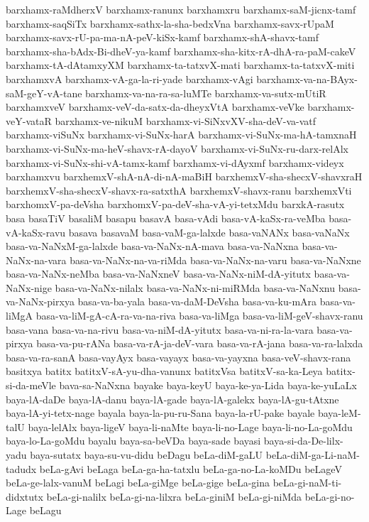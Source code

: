 {barxhamx-raMdherxV
barxhamx-ranunx
barxhamxru
barxhamx-saM-jicnx-tamf
barxhamx-saqSiTx
barxhamx-sathx-la-sha-bedxVna
barxhamx-savx-rUpaM
barxhamx-savx-rU-pa-ma-nA-peV-kiSx-kamf
barxhamx-shA-shavx-tamf
barxhamx-sha-bAdx-Bi-dheV-ya-kamf
barxhamx-sha-kitx-rA-dhA-ra-paM-cakeV
barxhamx-tA-dAtamxyXM
barxhamx-ta-tatxvX-mati
barxhamx-ta-tatxvX-miti
barxhamxvA
barxhamx-vA-ga-la-ri-yade
barxhamx-vAgi
barxhamx-va-na-BAyx-saM-geY-vA-tane
barxhamx-va-na-ra-sa-luMTe
barxhamx-va-sutx-mUtiR
barxhamxveV
barxhamx-veV-da-satx-da-dheyxVtA
barxhamx-veVke
barxhamx-veY-vataR
barxhamx-ve-nikuM
barxhamx-vi-SiNxvXV-sha-deV-va-vatf
barxhamx-viSuNx
barxhamx-vi-SuNx-harA
barxhamx-vi-SuNx-ma-hA-tamxnaH
barxhamx-vi-SuNx-ma-heV-shavx-rA-dayoV
barxhamx-vi-SuNx-ru-darx-relAlx
barxhamx-vi-SuNx-shi-vA-tamx-kamf
barxhamx-vi-dAyxmf
barxhamx-videyx
barxhamxvu
barxhemxV-shA-nA-di-nA-maBiH
barxhemxV-sha-shecxV-shavxraH
barxhemxV-sha-shecxV-shavx-ra-satxthA
barxhemxV-shavx-ranu
barxhemxVti
barxhomxV-pa-deVsha
barxhomxV-pa-deV-sha-vA-yi-tetxMdu
barxkA-rasutx
basa
basaTiV
basaliM
basapu
basavA
basa-vAdi
basa-vA-kaSx-ra-veMba
basa-vA-kaSx-ravu
basava
basavaM
basa-vaM-ga-lalxde
basa-vaNANx
basa-vaNaNx
basa-va-NaNxM-ga-lalxde
basa-va-NaNx-nA-mava
basa-va-NaNxna
basa-va-NaNx-na-vara
basa-va-NaNx-na-va-riMda
basa-va-NaNx-na-varu
basa-va-NaNxne
basa-va-NaNx-neMba
basa-va-NaNxneV
basa-va-NaNx-niM-dA-yitutx
basa-va-NaNx-nige
basa-va-NaNx-nilalx
basa-va-NaNx-ni-miRMda
basa-va-NaNxnu
basa-va-NaNx-pirxya
basa-va-ba-yala
basa-va-daM-DeVsha
basa-va-ku-mAra
basa-va-liMgA
basa-va-liM-gA-cA-ra-va-na-riva
basa-va-liMga
basa-va-liM-geV-shavx-ranu
basa-vana
basa-va-na-rivu
basa-va-niM-dA-yitutx
basa-va-ni-ra-la-vara
basa-va-pirxya
basa-va-pu-rANa
basa-va-rA-ja-deV-vara
basa-va-rA-jana
basa-va-ra-lalxda
basa-va-ra-sanA
basa-vayAyx
basa-vayayx
basa-va-yayxna
basa-veV-shavx-rana
basitxya
batitx
batitxV-sA-yu-dha-vanunx
batitxVsa
batitxV-sa-ka-Leya
batitx-si-da-meVle
bava-sa-NaNxna
bayake
baya-keyU
baya-ke-ya-Lida
baya-ke-yuLaLx
baya-lA-daDe
baya-lA-danu
baya-lA-gade
baya-lA-galekx
baya-lA-gu-tAtxne
baya-lA-yi-tetx-nage
bayala
baya-la-pu-ru-Sana
baya-la-rU-pake
bayale
baya-leM-talU
baya-lelAlx
baya-ligeV
baya-li-naMte
baya-li-no-Lage
baya-li-no-La-goMdu
baya-lo-La-goMdu
bayalu
baya-sa-beVDa
baya-sade
bayasi
baya-si-da-De-lilx-yadu
baya-sutatx
baya-su-vu-didu
beDagu
beLa-diM-gaLU
beLa-diM-ga-Li-naM-tadudx
beLa-gAvi
beLaga
beLa-ga-ha-tatxlu
beLa-ga-no-La-koMDu
beLageV
beLa-ge-lalx-vanuM
beLagi
beLa-giMge
beLa-gige
beLa-gina
beLa-gi-naM-ti-didxtutx
beLa-gi-nalilx
beLa-gi-na-lilxra
beLa-giniM
beLa-gi-niMda
beLa-gi-no-Lage
beLagu
}
